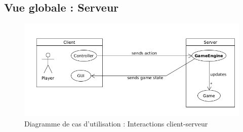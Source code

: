 \documentclass{report}
\begin{document}
\subsection{Vue globale : Serveur}

\vspace{-1em}

\begin{figure}[H]
    \centering
    \includegraphics[width=\textwidth, keepaspectratio]{src/server.png}
    \caption{Diagramme de cas d’utilisation : Interactions client-serveur}
    \label{fig:use_case_server}
\end{figure}
\end{document}
